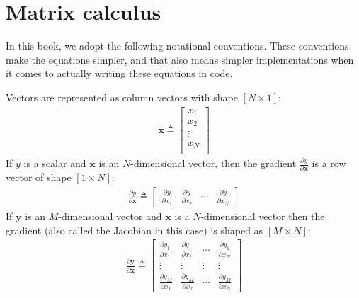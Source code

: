

\appendix

\section{Matrix calculus}\label{appendix:matrix_calc:notational_conventions}
In this book, we adopt the following notational conventions. These conventions make the equations simpler, and that also means simpler implementations when it comes to actually writing these equations in code.

Vectors are represented as column vectors with shape $[N \times 1]$:
\begin{align}
    \mathbf{x} \triangleq
    \begin{bmatrix}
        x_1    \\
        x_2    \\
        \vdots \\
        x_N    \\
    \end{bmatrix}
\end{align}
If $y$ is a scalar and $\mathbf{x}$ is an $N$-dimensional vector, then the gradient $\frac{\partial y}{\partial \mathbf{x}}$ is a row vector of shape  $[1 \times N]$:
\begin{align}
    \frac{\partial y}{\partial \mathbf{x}} \triangleq
    \begin{bmatrix}
        \frac{\partial y}{\partial x_1} & \frac{\partial y}{\partial x_2} & \cdots & \frac{\partial y}{\partial x_N} \label{backprop:scalar_vector_deriv}
    \end{bmatrix}
\end{align}
If $\mathbf{y}$ is an $M$-dimensional vector and $\mathbf{x}$ is a $N$-dimensional vector then the gradient (also called the Jacobian in this case) is shaped as $[M \times N]$:
\begin{align}
    \frac{\partial \mathbf{y}}{\partial \mathbf{x}} \triangleq
    \begin{bmatrix}
        \frac{\partial y_1}{\partial x_1} & \frac{\partial y_1}{\partial x_2} & \cdots & \frac{\partial y_1}{\partial x_N} \\
        \vdots                            & \vdots                            & \vdots & \vdots                            \\
        \frac{\partial y_M}{\partial x_1} & \frac{\partial y_M}{\partial x_2} & \cdots & \frac{\partial y_M}{\partial x_N}
    \end{bmatrix}
\end{align}
